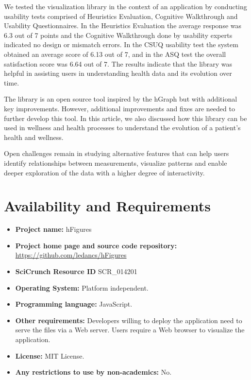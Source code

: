 \documentclass[twocolumn]{bmcart}%
\begin{document}

We tested the visualization library in the context of an application by conducting usability tests comprised of Heuristics Evaluation, Cognitive Walkthrough and Usability Questionnaires. In the Heuristics Evaluation the average response was 6.3 out of 7 points and the Cognitive Walkthrough done by usability experts indicated no design or mismatch errors. In the CSUQ usability test the system obtained an average score of 6.13 out of 7, and in the ASQ test the overall satisfaction score was 6.64 out of 7. The results indicate that the library was helpful in assisting users in understanding health data and its evolution over time. 

The library is an open source tool inspired by the hGraph but with additional key improvements. However, additional improvements and fixes are needed to further develop this tool. In this article, we also discussed how this library can be used in wellness and health processes to understand the evolution of a patient's health and wellness.

Open challenges remain in studying alternative features that can help users identify relationships between measurements, visualize patterns and enable deeper exploration of the data with a higher degree of interactivity.


\section*{Availability and Requirements}

\begin{itemize}
\item \textbf{Project name:} hFigures
\item \textbf{Project home page and source code repository:} \url{https://github.com/ledancs/hFigures}
\item \textbf{SciCrunch Resource ID} SCR\_014201
\item \textbf{Operating System:} Platform independent.
\item \textbf{Programming language:} JavaScript.
\item \textbf{Other requirements:} Developers willing to deploy the application need to serve the files via a Web server. Users require a Web browser to visualize the application.
\item \textbf{License:} MIT License.
\item \textbf{Any restrictions to use by non-academics:} No.
\end{itemize}
\end{document}

